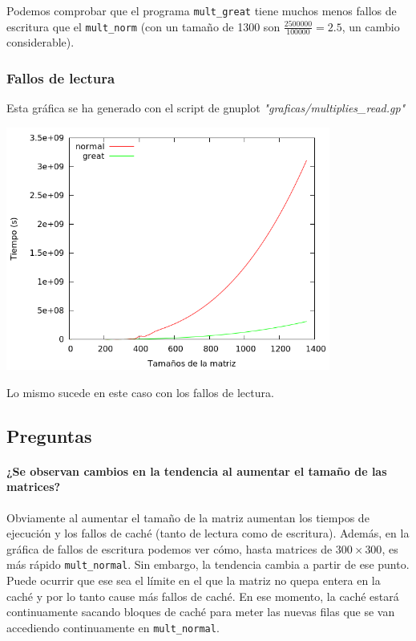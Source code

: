 \documentclass[nochap]{apuntes}
\begin{document}
Podemos comprobar que el programa \texttt{mult\_great} tiene muchos menos fallos de escritura que el \texttt{mult\_norm} (con un tamaño de 1300 son $\displaystyle \frac{2500000}{100000} = 2.5$, un cambio considerable).

\subsubsection*{Fallos de lectura}

Esta gráfica se ha generado con el script de gnuplot \emph{"graficas/multiplies\_read.gp"}

\begin{center}
\includegraphics[width=0.8\textwidth]{graficas/fotos/multiplies_read.png}
\end{center}

Lo mismo sucede en este caso con los fallos de lectura.

\subsection*{Preguntas}

\paragraph{¿Se observan cambios en la tendencia al aumentar el tamaño de las matrices?}

Obviamente al aumentar el tamaño de la matriz aumentan los tiempos de ejecución y los fallos de caché (tanto de lectura como de escritura). Además, en la gráfica de fallos de escritura podemos ver cómo, hasta matrices de $300×300$, es más rápido \texttt{mult\_normal}. Sin embargo, la tendencia cambia a partir de ese punto. Puede ocurrir que ese sea el límite en el que la matriz no quepa entera en la caché y por lo tanto cause más fallos de caché. En ese momento, la caché estará continuamente sacando bloques de caché para meter las nuevas filas que se van accediendo continuamente en \texttt{mult\_normal}.
\end{document}

